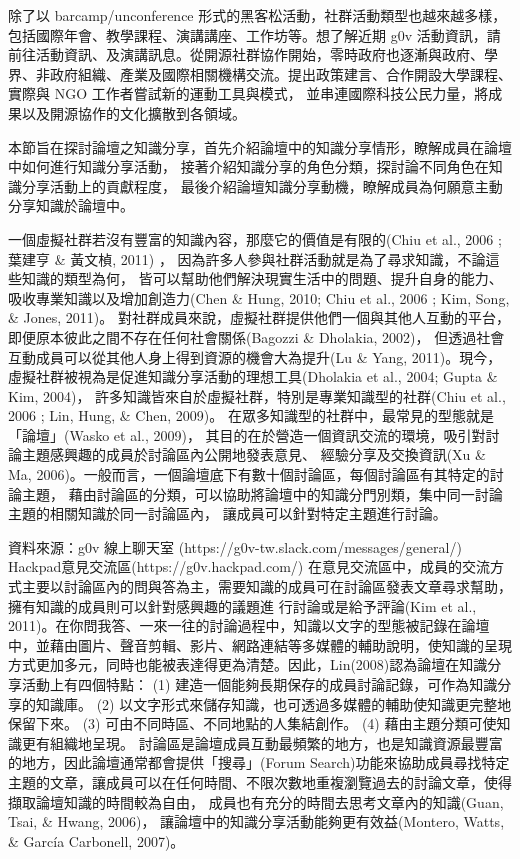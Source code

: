 除了以 barcamp/unconference 形式的黑客松活動，社群活動類型也越來越多樣，包括國際年會、教學課程、演講講座、工作坊等。想了解近期 g0v 活動資訊，請前往活動資訊、及演講訊息。從開源社群協作開始，零時政府也逐漸與政府、學界、非政府組織、產業及國際相關機構交流。提出政策建言、合作開設大學課程、實際與 NGO 工作者嘗試新的運動工具與模式，
並串連國際科技公民力量，將成果以及開源協作的文化擴散到各領域。

本節旨在探討論壇之知識分享，首先介紹論壇中的知識分享情形，瞭解成員在論壇中如何進行知識分享活動，
接著介紹知識分享的角色分類，探討論不同角色在知識分享活動上的貢獻程度，
最後介紹論壇知識分享動機，瞭解成員為何願意主動分享知識於論壇中。 


一個虛擬社群若沒有豐富的知識內容，那麼它的價值是有限的(Chiu et al.,
2006 ; 葉建亨 \& 黃文楨, 2011) ，
因為許多人參與社群活動就是為了尋求知識，不論這些知識的類型為何，
皆可以幫助他們解決現實生活中的問題、提升自身的能力、
吸收專業知識以及增加創造力(Chen \& Hung, 2010; Chiu et al., 2006 ; 
Kim, Song, \& Jones, 2011)。
對社群成員來說，虛擬社群提供他們一個與其他人互動的平台，
即便原本彼此之間不存在任何社會關係(Bagozzi \& Dholakia, 2002)，
但透過社會互動成員可以從其他人身上得到資源的機會大為提升(Lu \& Yang, 2011)。現今，
虛擬社群被視為是促進知識分享活動的理想工具(Dholakia et al., 2004; Gupta \& Kim, 2004)，
許多知識皆來自於虛擬社群，特別是專業知識型的社群(Chiu et al., 2006 ; 
Lin, Hung, \& Chen, 2009)。
 在眾多知識型的社群中，最常見的型態就是「論壇」(Wasko et al., 2009)，
 其目的在於營造一個資訊交流的環境，吸引對討論主題感興趣的成員於討論區內公開地發表意見、
 經驗分享及交換資訊(Xu \& Ma, 2006)。一般而言，一個論壇底下有數十個討論區，每個討論區有其特定的討論主題，
 藉由討論區的分類，可以協助將論壇中的知識分門別類，集中同一討論主題的相關知識於同一討論區內，
 讓成員可以針對特定主題進行討論。 


資料來源：g0v 線上聊天室 (https://g0v-tw.slack.com/messages/general/)
          Hackpad意見交流區(https://g0v.hackpad.com/)
 在意見交流區中，成員的交流方式主要以討論區內的問與答為主，需要知識的成員可在討論區發表文章尋求幫助，
 擁有知識的成員則可以針對感興趣的議題進
行討論或是給予評論(Kim et al., 2011)。在你問我答、一來一往的討論過程中，知識以文字的型態被記錄在論壇中，並藉由圖片、聲音剪輯、影片、網路連結等多媒體的輔助說明，使知識的呈現方式更加多元，同時也能被表達得更為清楚。因此，Lin(2008)認為論壇在知識分享活動上有四個特點：
(1) 建造一個能夠長期保存的成員討論記錄，可作為知識分享的知識庫。
(2) 以文字形式來儲存知識，也可透過多媒體的輔助使知識更完整地保留下來。
(3) 可由不同時區、不同地點的人集結創作。
(4) 藉由主題分類可使知識更有組織地呈現。 
 討論區是論壇成員互動最頻繁的地方，也是知識資源最豐富的地方，因此論壇通常都會提供「搜尋」(Forum Search)功能來協助成員尋找特定主題的文章，讓成員可以在任何時間、不限次數地重複瀏覽過去的討論文章，使得擷取論壇知識的時間較為自由，
 成員也有充分的時間去思考文章內的知識(Guan, Tsai, \& Hwang, 2006)，
 讓論壇中的知識分享活動能夠更有效益(Montero, Watts, \& García Carbonell, 2007)。 

